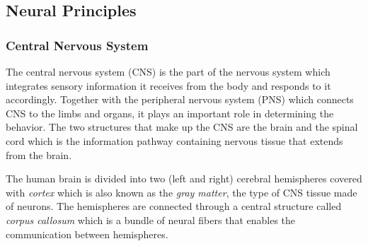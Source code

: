 \documentclass[12pt]{article}
\newcommand\mysubsection[1]{\subsection{#1}}
\newcommand\mysubsubsection[1]{\subsubsection{#1}}
\numberwithin{equation}{section}
\numberwithin{figure}{section}
\numberwithin{table}{section}
\begin{document}
\mysubsection{Neural Principles}
\mysubsubsection{Central Nervous System}
\par{
    The central nervous system (CNS) is the part of the nervous system which
    integrates sensory information it receives from the body and responds to it accordingly.
    Together with the peripheral nervous system (PNS) which connects CNS to the
    limbs and organs, it plays an important role in determining the behavior. The two
    structures that make up the CNS are the brain and the spinal cord which is the
    information pathway containing nervous tissue that extends from the brain.
}
\par{
    The human brain is divided into two (left and right) cerebral hemispheres
    covered with \emph{cortex} which is also known as the \emph{gray matter},
    the type of CNS tissue made of neurons. The hemispheres are connected
    through a central structure called \emph{corpus callosum} which is a bundle
    of neural fibers that enables the communication between hemispheres.
}
\end{document}
